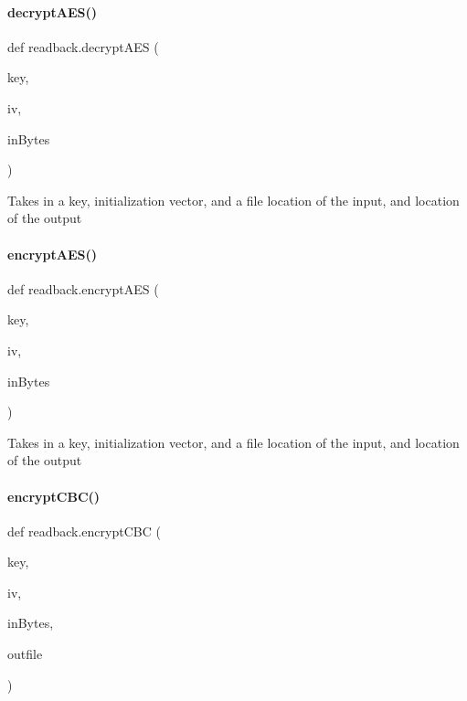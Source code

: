 \paragraph{\texorpdfstring{decrypt\+A\+E\+S()}{decryptAES()}}
{\footnotesize\ttfamily def readback.\+decrypt\+A\+ES (\begin{DoxyParamCaption}\item[{}]{key,  }\item[{}]{iv,  }\item[{}]{in\+Bytes }\end{DoxyParamCaption})}

\begin{DoxyVerb}Takes in a key, initialization vector, and a file location of the     input, and location of the output\end{DoxyVerb}
 \mbox{\label{namespacereadback_a31d9a10134fc94e40ec6db79938a0b38}} 
\paragraph{\texorpdfstring{encrypt\+A\+E\+S()}{encryptAES()}}
{\footnotesize\ttfamily def readback.\+encrypt\+A\+ES (\begin{DoxyParamCaption}\item[{}]{key,  }\item[{}]{iv,  }\item[{}]{in\+Bytes }\end{DoxyParamCaption})}

\begin{DoxyVerb}Takes in a key, initialization vector, and a file location of the     input, and location of the output\end{DoxyVerb}
 \mbox{\label{namespacereadback_a5a22755f0dd142ba5bf578139f319a0e}} 
\paragraph{\texorpdfstring{encrypt\+C\+B\+C()}{encryptCBC()}}
{\footnotesize\ttfamily def readback.\+encrypt\+C\+BC (\begin{DoxyParamCaption}\item[{}]{key,  }\item[{}]{iv,  }\item[{}]{in\+Bytes,  }\item[{}]{outfile }\end{DoxyParamCaption})}


